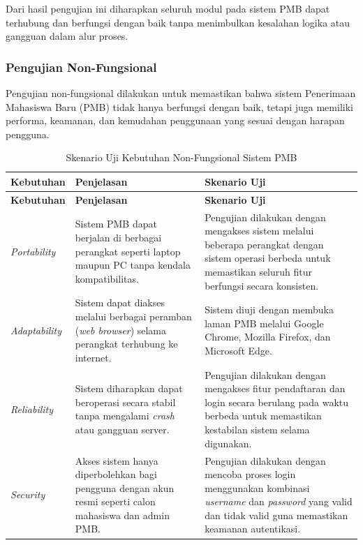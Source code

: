 Dari hasil pengujian ini diharapkan seluruh modul pada sistem PMB dapat terhubung dan berfungsi dengan baik tanpa menimbulkan kesalahan logika atau gangguan dalam alur proses.\par

\subsubsection{Pengujian Non-Fungsional}
Pengujian non-fungsional dilakukan untuk memastikan bahwa sistem Penerimaan Mahasiswa Baru (PMB) tidak hanya berfungsi dengan baik, tetapi juga memiliki performa, keamanan, dan kemudahan penggunaan yang sesuai dengan harapan pengguna.\par

\begin{longtable}{|p{}|p{}|p{}|}
	\caption{Skenario Uji Kebutuhan Non-Fungsional Sistem PMB}
	\label{table:3.nonfungsional}\\
	\hline
	\textbf{Kebutuhan} & \textbf{Penjelasan} & \textbf{Skenario Uji} \\
	\hline
	\endfirsthead
	\hline
	\textbf{Kebutuhan} & \textbf{Penjelasan} & \textbf{Skenario Uji} \\
	\hline
	\endhead
	\textit{Portability} & Sistem PMB dapat berjalan di berbagai perangkat seperti laptop maupun PC tanpa kendala kompatibilitas. & Pengujian dilakukan dengan mengakses sistem melalui beberapa perangkat dengan sistem operasi berbeda untuk memastikan seluruh fitur berfungsi secara konsisten. \\
	\hline
	\textit{Adaptability} & Sistem dapat diakses melalui berbagai peramban (\textit{web browser}) selama perangkat terhubung ke internet. & Sistem diuji dengan membuka laman PMB melalui Google Chrome, Mozilla Firefox, dan Microsoft Edge. \\
	\hline
	\textit{Reliability} & Sistem diharapkan dapat beroperasi secara stabil tanpa mengalami \textit{crash} atau gangguan server. & Pengujian dilakukan dengan mengakses fitur pendaftaran dan login secara berulang pada waktu berbeda untuk memastikan kestabilan sistem selama digunakan. \\
	\hline
	\textit{Security} & Akses sistem hanya diperbolehkan bagi pengguna dengan akun resmi seperti calon mahasiswa dan admin PMB. & Pengujian dilakukan dengan mencoba proses login menggunakan kombinasi \textit{username} dan \textit{password} yang valid dan tidak valid guna memastikan keamanan autentikasi. \\

\end{longtable}
